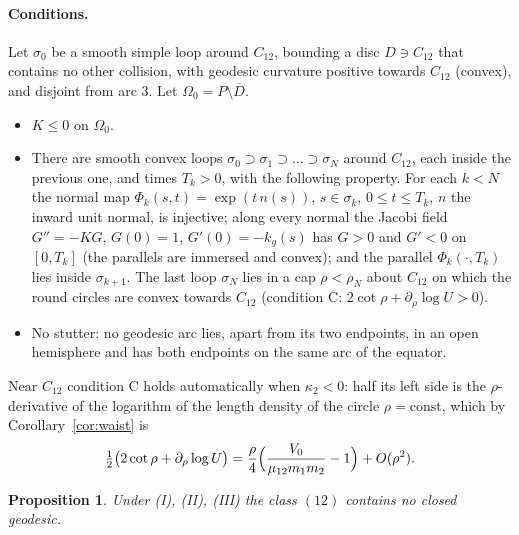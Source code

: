 \documentclass[11pt]{article}
\newtheorem{proposition}[theorem]{Proposition}
\theoremstyle{definition}
\begin{document}
\paragraph{Conditions.} Let $\sigma_0$ be a smooth simple loop around $C_{12}$, bounding a disc $D\ni C_{12}$ that
contains no other collision, with geodesic curvature positive towards $C_{12}$ (convex), and disjoint from arc $3$.
Let $\Omega_0=P\setminus\overline D$.
\begin{itemize}
\item[(I)] $K\le0$ on $\Omega_0$.
\item[(II)] There are smooth convex loops $\sigma_0\supset\sigma_1\supset\dots\supset\sigma_N$ around $C_{12}$, each
inside the previous one, and times $T_k>0$, with the following property. For each $k<N$ the normal map
$\Phi_k(s,t)=\exp(t\,n(s))$, $s\in\sigma_k$, $0\le t\le T_k$, $n$ the inward unit normal, is injective; along every
normal the Jacobi field $G''=-KG$, $G(0)=1$, $G'(0)=-k_g(s)$ has $G>0$ and $G'<0$ on $[0,T_k]$ (the parallels are
immersed and convex); and the parallel $\Phi_k(\cdot,T_k)$ lies inside $\sigma_{k+1}$. The last loop $\sigma_N$ lies
in a cap $\rho<\rho_N$ about $C_{12}$ on which the round circles are convex towards $C_{12}$ (condition C:
$2\cot\rho+\partial_\rho\log U>0$).
\item[(III)] No stutter: no geodesic arc lies, apart from its two endpoints, in an open hemisphere and has both
endpoints on the same arc of the equator.
\end{itemize}
Near $C_{12}$ condition C holds automatically when $\kappa_2<0$: half its left side is the $\rho$-derivative of the
logarithm of the length density of the circle $\rho=\mathrm{const}$, which by Corollary~\ref{cor:waist} is
\[
  \tfrac12\bigl(2\cot\rho+\partial_\rho\log U\bigr)=\frac\rho4\Bigl(\frac{V_0}{\mu_{12}m_1m_2}-1\Bigr)+O(\rho^2).
\]

\begin{proposition}\label{prop:G}
Under (I), (II), (III) the class $(12)$ contains no closed geodesic.
\end{proposition}
\end{document}

